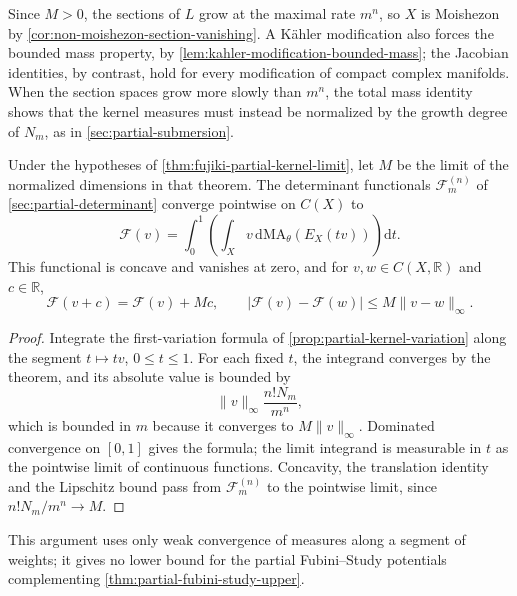 Since $M>0$, the sections of $L$ grow at the maximal rate $m^n$, so $X$ is Moishezon by \cref{cor:non-moishezon-section-vanishing}. A K\"ahler modification also forces the bounded mass property, by \cref{lem:kahler-modification-bounded-mass}; the Jacobian identities, by contrast, hold for every modification of compact complex manifolds. When the section spaces grow more slowly than $m^n$, the total mass identity shows that the kernel measures must instead be normalized by the growth degree of $N_m$, as in \cref{sec:partial-submersion}.

\begin{corollary}\label{cor:fujiki-partial-determinant}
Under the hypotheses of \cref{thm:fujiki-partial-kernel-limit}, let $M$ be the limit of the normalized dimensions in that theorem. The determinant functionals $\mathcal F_m^{(n)}$ of \cref{sec:partial-determinant} converge pointwise on $C(X)$ to
\[
 \mathcal F(v)=\int_0^1\!\left(\int_X
       v\,\mathrm{d}\mathrm{MA}_\theta(E_X(tv))\right)\mathrm{d}t.
\]
This functional is concave and vanishes at zero, and for $v,w\in C(X,\mathbb R)$ and $c\in\mathbb R$,
\[
 \mathcal F(v+c)=\mathcal F(v)+Mc,\qquad
 |\mathcal F(v)-\mathcal F(w)|\leq M\|v-w\|_\infty.
\]
\end{corollary}
\begin{proof}
Integrate the first-variation formula of \cref{prop:partial-kernel-variation} along the segment $t\mapsto tv$, $0\leq t\leq1$. For each fixed $t$, the integrand converges by the theorem, and its absolute value is bounded by
\[
 \|v\|_\infty\frac{n!N_m}{m^n},
\]
which is bounded in $m$ because it converges to $M\|v\|_\infty$. Dominated convergence on $[0,1]$ gives the formula; the limit integrand is measurable in $t$ as the pointwise limit of continuous functions. Concavity, the translation identity and the Lipschitz bound pass from $\mathcal F_m^{(n)}$ to the pointwise limit, since $n!N_m/m^n\to M$.
\end{proof}

This argument uses only weak convergence of measures along a segment of weights; it gives no lower bound for the partial Fubini--Study potentials complementing \cref{thm:partial-fubini-study-upper}.
